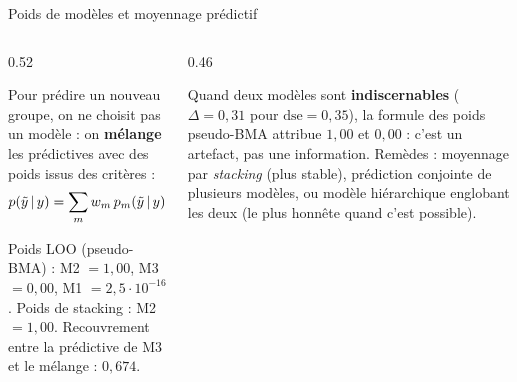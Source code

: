 \begin{frame}{Poids de modèles et moyennage prédictif}

\vspace{-1mm}
\begin{columns}[t]
\begin{column}{0.52\textwidth}
\begin{kbox}
Pour prédire un nouveau groupe, on ne choisit pas un modèle : on \textbf{mélange}
les prédictives avec des poids issus des critères :
\[
p(\tilde y \,\vert\, y) = \sum_{m} w_m\, p_m(\tilde y \,\vert\, y)
\]
\end{kbox}
\begin{ebox}
Poids LOO (pseudo-BMA) : M2 $=1{,}00$, M3 $=0{,}00$, M1 $=2{,}5\cdot10^{-16}$.
Poids de stacking : M2 $=1{,}00$.
Recouvrement entre la prédictive de M3 et le mélange : $0{,}674$.
\end{ebox}
\end{column}
\begin{column}{0.46\textwidth}
\begin{wbox}
Quand deux modèles sont \textbf{indiscernables} ($\Delta = 0{,}31$ pour
$\text{dse} = 0{,}35$), la formule des poids pseudo-BMA attribue
$1{,}00$ et $0{,}00$ : c'est un artefact, pas une information.
\vspace{1mm}
\footnotesize Remèdes : moyennage par \emph{stacking} (plus stable),
prédiction conjointe de plusieurs modèles, ou modèle hiérarchique
englobant les deux (le plus honnête quand c'est possible).
\end{wbox}
\end{column}
\end{columns}
\end{frame}

